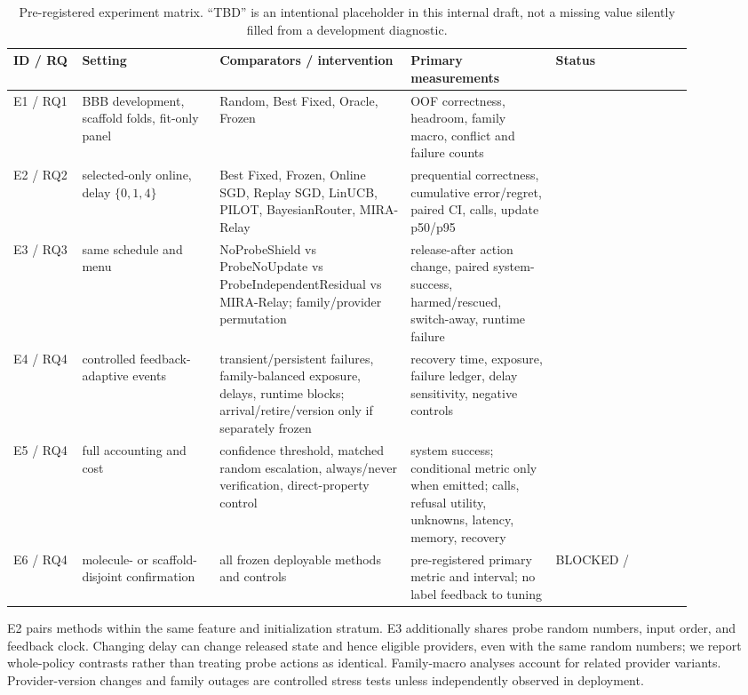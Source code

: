\documentclass[sigconf,anonymous]{aamas}
\newcommand{\tbd}{\text{TBD}}
\begin{document}
\begin{table}[t]
\caption{Pre-registered experiment matrix. ``TBD'' is an intentional placeholder in this internal draft, not a missing value silently filled from a development diagnostic.}
\label{tab:matrix}
\small
\begin{tabular}{p{0.09\linewidth}p{0.18\linewidth}p{0.25\linewidth}p{0.19\linewidth}p{0.18\linewidth}}
\toprule
ID / RQ & Setting & Comparators / intervention & Primary measurements & Status \\
\midrule
E1 / RQ1 & BBB development, scaffold folds, fit-only panel & Random, Best Fixed, Oracle, Frozen & OOF correctness, headroom, family macro, conflict and failure counts & \tbd{} \\
E2 / RQ2 & selected-only online, delay $\{0,1,4\}$ & Best Fixed, Frozen, Online SGD, Replay SGD, LinUCB, PILOT, BayesianRouter, MIRA-Relay & prequential correctness, cumulative error/regret, paired CI, calls, update p50/p95 & \tbd{} \\
E3 / RQ3 & same schedule and menu & NoProbeShield vs ProbeNoUpdate vs ProbeIndependentResidual vs MIRA-Relay; family/provider permutation & release-after action change, paired system-success, harmed/rescued, switch-away, runtime failure & \tbd{} \\
E4 / RQ4 & controlled feedback-adaptive events & transient/persistent failures, family-balanced exposure, delays, runtime blocks; arrival/retire/version only if separately frozen & recovery time, exposure, failure ledger, delay sensitivity, negative controls & \tbd{} \\
E5 / RQ4 & full accounting and cost & confidence threshold, matched random escalation, always/never verification, direct-property control & system success; conditional metric only when emitted; calls, refusal utility, unknowns, latency, memory, recovery & \tbd{} \\
E6 / RQ4 & molecule- or scaffold-disjoint confirmation & all frozen deployable methods and controls & pre-registered primary metric and interval; no label feedback to tuning & BLOCKED / \tbd{} \\
\bottomrule
\end{tabular}
\end{table}

E2 pairs methods within the same feature and initialization stratum. E3 additionally shares probe random numbers, input order, and feedback clock. Changing delay can change released state and hence eligible providers, even with the same random numbers; we report whole-policy contrasts rather than treating probe actions as identical. Family-macro analyses account for related provider variants. Provider-version changes and family outages are controlled stress tests unless independently observed in deployment.
\end{document}
